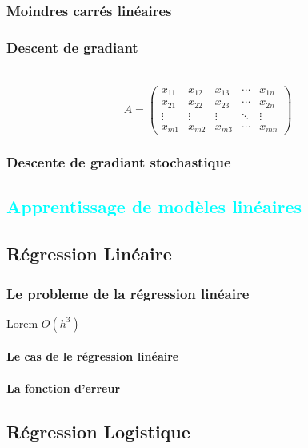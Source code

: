 	\subsection{Moindres carrés linéaires}
		\lipsum[1] %
	
	
	
	\subsection{Descent de gradiant}
		\lipsum[1] \\ 
		
		$$A = \begin{pmatrix}
		x_{11} & x_{12} & x_{13} & \cdots & x_{1n} \\
		x_{21} & x_{22} & x_{23} & \cdots & x_{2n} \\
		\vdots & \vdots & \vdots & \ddots & \vdots \\
		x_{m1} & x_{m2} & x_{m3} & \cdots & x_{mn} 
		\end{pmatrix}$$
	
	
		\lipsum[4]
	
	\subsection{Descente de gradiant stochastique}
		\lipsum[1]	
\textcolor{cyan}{\chapter{Apprentissage de modèles linéaires}}
	\section{Régression Linéaire}
	\subsection{Le probleme de la régression linéaire}
		Lorem $O(h^3)$ 
		\lipsum[1]
	\subsubsection{Le cas de le régression linéaire}
		\lipsum[1]
	\subsubsection{La fonction d'erreur}
	
	
	\section{Régression Logistique}
